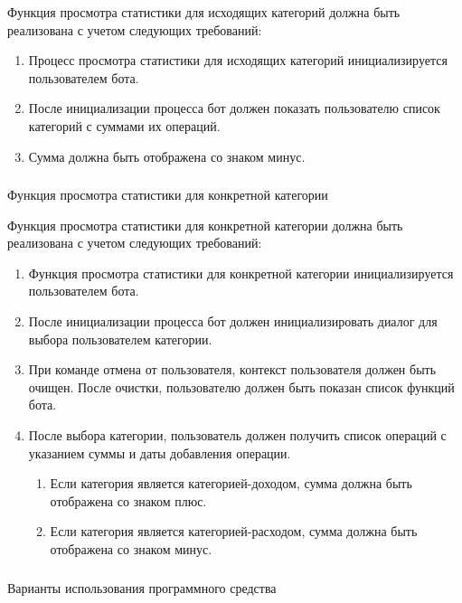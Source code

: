 Функция просмотра статистики для исходящих категорий должна быть реализована с учетом следующих требований:

\begin{enumerate}
	\item Процесс просмотра статистики для исходящих категорий инициализируется пользователем бота.
	\item После инициализации процесса бот должен показать пользователю список категорий с суммами их операций.
	\item Сумма должна быть отображена со знаком минус.
\end{enumerate}

\subsubsection{} Функция просмотра статистики для конкретной категории
\label{sec:domain:specification:showcustomcategorystats}

Функция просмотра статистики для конкретной категории должна быть реализована с учетом следующих требований:

\begin{enumerate}
	\item Функция просмотра статистики для конкретной категории инициализируется пользователем бота.
	\item После инициализации процесса бот должен инициализировать диалог для выбора пользователем категории.
	\item При команде отмена от пользователя, контекст пользователя должен быть очищен. После очистки, пользователю должен быть показан список функций бота.
	\item После выбора категории, пользователь должен получить список операций с указанием суммы и даты добавления операции.
	\begin{enumerate}
		\item Если категория является категорией-доходом, сумма должна быть отображена со знаком плюс.
		\item Если категория является категорией-расходом, сумма должна быть отображена со знаком минус.
	\end{enumerate}
\end{enumerate}

\subsubsection{} Варианты использования программного средства
\label{sec:domain:model:use_cases}

